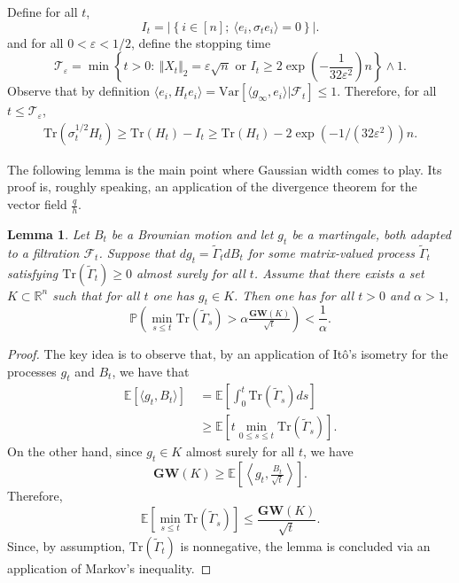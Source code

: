\documentclass[12pt]{article}
\def \RR {\mathbb R}
\def \EE {\mathbb E}
\def \PP {\mathbb P}
\def \eps {\varepsilon}
\def \TTT {\mathcal{T}}
\def \FF {\mathcal{F}}
\def \tr {\mathrm{Tr}}
\def \MW {\mathbf{GW}}
\newtheorem{lemma}[theorem]{Lemma}
\theoremstyle{definition}
\theoremstyle{remark}
\begin{document}
Define for all $t$,
$$
I_t = \left | \left \{i \in [n]; ~ \langle e_i, \sigma_t e_i \rangle = 0 \right \} \right |.
$$
and for all $0 < \eps < 1/2$, define the stopping time
$$
\TTT_{\eps} = \min \left \{ t>0: ~ \Vert X_t \Vert_2 = \eps \sqrt{n} \mbox{ or } I_t \geq 2 \exp \left (- \frac{1}{32 \eps^2} \right ) n \right \} \wedge 1.
$$
Observe that by definition $\langle e_i, H_t e_i \rangle = \mathrm{Var}[\langle g_\infty, e_i \rangle | \FF_t] \leq 1$. Therefore, for all $t \leq \TTT_\eps$, 
\begin{align} 
\tr(\sigma_t^{1/2} H_t) \geq \tr(H_t) - I_t \geq \tr(H_t) - 2 \exp(-1/(32 \eps^2)) n. \label{eq:traces}
\end{align}

The following lemma is the main point where Gaussian width comes to play. Its proof is, roughly speaking, an application of the divergence theorem for the vector field $\frac{q}{h}$.
\begin{lemma} \label{lem:divergence}
Let $B_t$ be a Brownian motion and let $g_t$ be a martingale, both adapted to a filtration $\FF_t$. Suppose that $d g_t = \tilde \Gamma_t d B_t$ for some matrix-valued process $\tilde \Gamma_t$ satisfying $\tr \left (\tilde \Gamma_t \right ) \geq 0$ almost surely for all $t$. Assume that there exists a set $K \subset \RR^n$ such that for all $t$ one has $g_t \in K$. Then one has for all $t>0$ and $\alpha > 1$,
$$
\PP \left ( \min_{s \leq t} \tr(\tilde \Gamma_s) > \alpha \tfrac{\MW(K)}{\sqrt{t}} \right ) < \frac{1}{\alpha}.
$$
\end{lemma}
\begin{proof}
The key idea is to observe that, by an application of It\^{o}'s isometry for the processes $g_{t}$ and $B_{t}$, we have that
\begin{align*}
\EE [ \langle g_{t}, B_{t} \rangle] ~& = \EE \left [ \int_0^{t} \tr \left (\tilde \Gamma_s \right ) ds \right ] \\
& \geq \EE \left [ t \min_{0 \leq s\leq t} \tr(\tilde \Gamma_s) \right ].
\end{align*}
On the other hand, since $g_t \in K$ almost surely for all $t$, we have
$$
\MW(K) \geq \EE \left [ \left \langle g_{t}, \tfrac{B_t}{\sqrt{t}} \right \rangle \right ].
$$
Therefore,
$$
\EE \left [ \min_{s\leq t} \tr(\tilde \Gamma_s) \right ] \leq \frac{\MW(K)}{\sqrt{t}}.
$$
Since, by assumption, $\tr(\tilde \Gamma_t)$ is nonnegative, the lemma is concluded via an application of Markov's inequality.
\end{proof}
\end{document}
